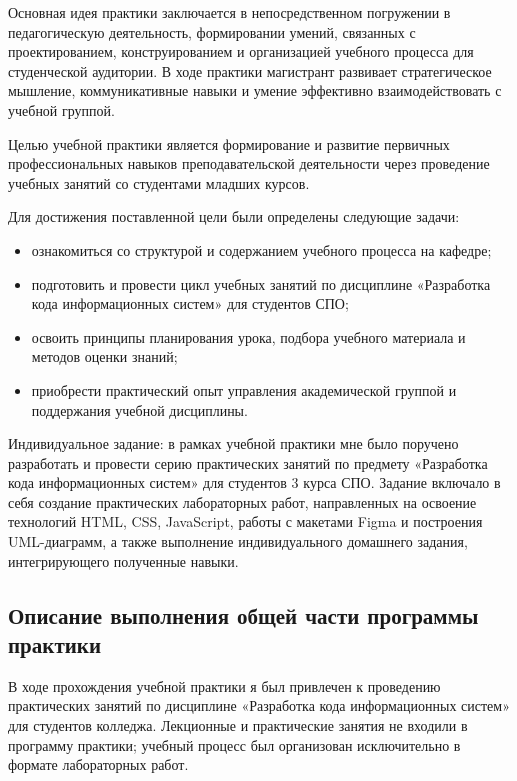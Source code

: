 Основная идея практики заключается в непосредственном погружении в педагогическую деятельность, формировании умений, связанных с проектированием, конструированием и организацией учебного процесса для студенческой аудитории. В ходе практики магистрант развивает стратегическое мышление, коммуникативные навыки и умение эффективно взаимодействовать с учебной группой.

Целью учебной практики является формирование и развитие первичных профессиональных навыков преподавательской деятельности через проведение учебных занятий со студентами младших курсов.

Для достижения поставленной цели были определены следующие задачи:
\begin{itemize}
    \item ознакомиться со структурой и содержанием учебного процесса на кафедре;
    \item подготовить и провести цикл учебных занятий по дисциплине «Разработка кода информационных систем» для студентов СПО;
    \item освоить принципы планирования урока, подбора учебного материала и методов оценки знаний;
    \item приобрести практический опыт управления академической группой и поддержания учебной дисциплины.
\end{itemize}

Индивидуальное задание: в рамках учебной практики мне было поручено разработать и провести серию практических занятий по предмету «Разработка кода информационных систем» для студентов 3 курса СПО. Задание включало в себя создание практических лабораторных работ, направленных на освоение технологий HTML, CSS, JavaScript, работы с макетами Figma и построения UML-диаграмм, а также выполнение индивидуального домашнего задания, интегрирующего полученные навыки.

\subsection{Описание выполнения общей части программы практики}

В ходе прохождения учебной практики я был привлечен к проведению практических занятий по дисциплине «Разработка кода информационных систем» для студентов колледжа. Лекционные и практические занятия не входили в программу практики; учебный процесс был организован исключительно в формате лабораторных работ.

